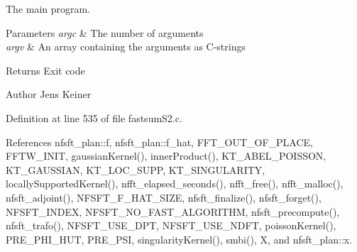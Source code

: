 The main program. 


\begin{DoxyParams}{Parameters}
{\em argc} & The number of arguments \\
\hline
{\em argv} & An array containing the arguments as C-\/strings\\
\hline
\end{DoxyParams}
\begin{DoxyReturn}{Returns}
Exit code
\end{DoxyReturn}
\begin{DoxyAuthor}{Author}
Jens Keiner 
\end{DoxyAuthor}


Definition at line 535 of file fastsum\-S2.\-c.



References nfsft\-\_\-plan\-::f, nfsft\-\_\-plan\-::f\-\_\-hat, F\-F\-T\-\_\-\-O\-U\-T\-\_\-\-O\-F\-\_\-\-P\-L\-A\-C\-E, F\-F\-T\-W\-\_\-\-I\-N\-I\-T, gaussian\-Kernel(), inner\-Product(), K\-T\-\_\-\-A\-B\-E\-L\-\_\-\-P\-O\-I\-S\-S\-O\-N, K\-T\-\_\-\-G\-A\-U\-S\-S\-I\-A\-N, K\-T\-\_\-\-L\-O\-C\-\_\-\-S\-U\-P\-P, K\-T\-\_\-\-S\-I\-N\-G\-U\-L\-A\-R\-I\-T\-Y, locally\-Supported\-Kernel(), nfft\-\_\-elapsed\-\_\-seconds(), nfft\-\_\-free(), nfft\-\_\-malloc(), nfsft\-\_\-adjoint(), N\-F\-S\-F\-T\-\_\-\-F\-\_\-\-H\-A\-T\-\_\-\-S\-I\-Z\-E, nfsft\-\_\-finalize(), nfsft\-\_\-forget(), N\-F\-S\-F\-T\-\_\-\-I\-N\-D\-E\-X, N\-F\-S\-F\-T\-\_\-\-N\-O\-\_\-\-F\-A\-S\-T\-\_\-\-A\-L\-G\-O\-R\-I\-T\-H\-M, nfsft\-\_\-precompute(), nfsft\-\_\-trafo(), N\-F\-S\-F\-T\-\_\-\-U\-S\-E\-\_\-\-D\-P\-T, N\-F\-S\-F\-T\-\_\-\-U\-S\-E\-\_\-\-N\-D\-F\-T, poisson\-Kernel(), P\-R\-E\-\_\-\-P\-H\-I\-\_\-\-H\-U\-T, P\-R\-E\-\_\-\-P\-S\-I, singularity\-Kernel(), smbi(), X, and nfsft\-\_\-plan\-::x.


